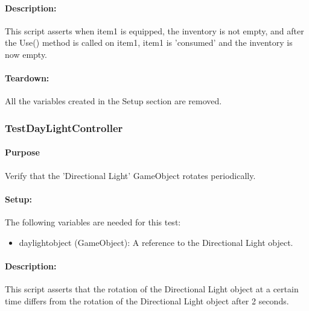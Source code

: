 \documentclass[12pt, titlepage]{article}
\begin{document}
{\begin{itemize}
\end{itemize}
\paragraph{Description: }
This script asserts when item1 is equipped, the inventory is not empty, and after the Use() method is called on item1, item1 is 'consumed' and the inventory is now empty.
\paragraph{Teardown: } All the variables created in the Setup section are removed.
\subsubsection{Test\textunderscore DayLightController}


\paragraph{Purpose} Verify that the 'Directional Light' GameObject rotates periodically.

\paragraph{Setup: } The following variables are needed for this test:
\begin{itemize}
	\item daylightobject (GameObject): A reference to the Directional Light object.
	
\end{itemize}
\paragraph{Description: }
This script asserts that the rotation of the Directional Light object at a certain time differs from the rotation of the Directional Light object after 2 seconds.

}
\end{document}
